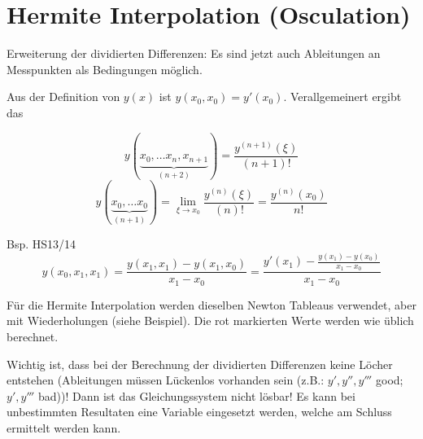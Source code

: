 \section{Hermite Interpolation (Osculation)}
Erweiterung der dividierten Differenzen: Es sind jetzt auch Ableitungen an Messpunkten als
Bedingungen möglich.

Aus der Definition von $y(x)$ ist $y(x_0,x_0) = y'(x_0)$. Verallgemeinert ergibt das

\begin{minipage}{9cm}

\[y(\underbrace{x_0, \ldots x_n, x_{n+1}}_{(n+2)}) = \frac{y^{(n+1)}(\xi)}{(n+1)!}\]
\[y(\underbrace{x_0, \ldots x_0}_{(n+1)}) = \lim_{\xi \rightarrow x_0} \frac{y^{(n)}(\xi)}{(n)!} = \frac{y^{(n)}(x_0)}{n!}\]
\end{minipage}
\begin{minipage}{6cm}
Bsp. HS13/14 \\
\[ y(x_0,x_1,x_1) = \frac{y(x_1,x_1) - y(x_1,x_0)}{x_1 - x_0} = \frac{y'(x_1) - \frac{y(x_1) - y(x_0)}{x_1 - x_0}}{x_1 - x_0}\]
\end{minipage}


Für die Hermite Interpolation werden dieselben Newton Tableaus verwendet, aber mit Wiederholungen (siehe Beispiel).
Die rot markierten Werte werden wie üblich berechnet.

Wichtig ist, dass bei der Berechnung der dividierten Differenzen keine Löcher entstehen (Ableitungen müssen Lückenlos vorhanden sein (z.B.: $y',y'',y'''$ good; $y',y'''$ bad))! Dann ist das
Gleichungssystem nicht lösbar! Es kann bei unbestimmten Resultaten eine Variable eingesetzt werden,
welche am Schluss ermittelt werden kann.

